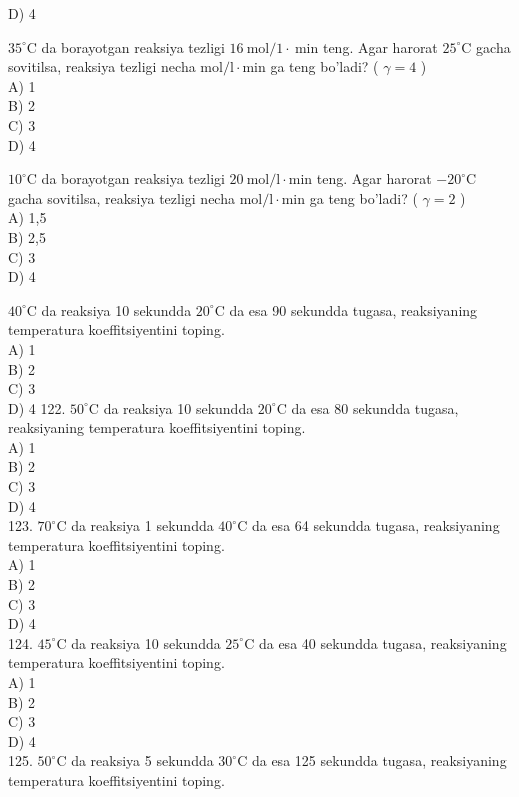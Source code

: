 D) 4
  \item $35^{\circ} \mathrm{C}$ da borayotgan reaksiya tezligi $16 \mathrm{~mol} / 1 \cdot \mathrm{~min}$ teng. Agar harorat $25^{\circ} \mathrm{C}$ gacha sovitilsa, reaksiya tezligi necha $\mathrm{mol} / \mathrm{l} \cdot \mathrm{min}$ ga teng bo'ladi? ( $\gamma=4$ )\\
A) 1\\
B) 2\\
C) 3\\
D) 4
  \item $10^{\circ} \mathrm{C}$ da borayotgan reaksiya tezligi $20 \mathrm{~mol} / \mathrm{l} \cdot \mathrm{min}$ teng. Agar harorat $-20^{\circ} \mathrm{C}$\\
gacha sovitilsa, reaksiya tezligi necha $\mathrm{mol} / \mathrm{l} \cdot \mathrm{min}$ ga teng bo'ladi? ( $\gamma=2$ )\\
A) 1,5\\
B) 2,5\\
C) 3\\
D) 4
  \item $40^{\circ} \mathrm{C}$ da reaksiya 10 sekundda $20^{\circ} \mathrm{C}$ da esa 90 sekundda tugasa, reaksiyaning temperatura koeffitsiyentini toping.\\
A) 1\\
B) 2\\
C) 3\\
D) 4
122. $50^{\circ} \mathrm{C}$ da reaksiya 10 sekundda $20^{\circ} \mathrm{C}$ da esa 80 sekundda tugasa, reaksiyaning temperatura koeffitsiyentini toping.\\
A) 1\\
B) 2\\
C) 3\\
D) 4\\
123. $70^{\circ} \mathrm{C}$ da reaksiya 1 sekundda $40^{\circ} \mathrm{C}$ da esa 64 sekundda tugasa, reaksiyaning temperatura koeffitsiyentini toping.\\
A) 1\\
B) 2\\
C) 3\\
D) 4\\
124. $45^{\circ} \mathrm{C}$ da reaksiya 10 sekundda $25^{\circ} \mathrm{C}$ da esa 40 sekundda tugasa, reaksiyaning temperatura koeffitsiyentini toping.\\
A) 1\\
B) 2\\
C) 3\\
D) 4\\
125. $50^{\circ} \mathrm{C}$ da reaksiya 5 sekundda $30^{\circ} \mathrm{C}$ da esa 125 sekundda tugasa, reaksiyaning temperatura koeffitsiyentini toping.\\

